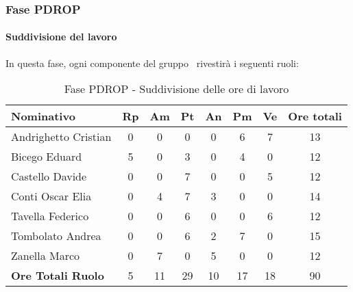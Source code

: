 \documentclass[../PianoProgetto.tex]{subfiles}
\begin{document}
	\subsubsection{Fase PDROP}
				\paragraph{Suddivisione del lavoro}
					In questa fase, ogni componente del gruppo \leaf\ rivestirà i seguenti ruoli:
	
	\begin{table}[h]
		\begin{tabularx}{\textwidth}{l  * {6}{C}  c}
			\toprule
			\textbf{Nominativo} & \textbf{Rp} & \textbf{Am} & \textbf{Pt} 
						& \textbf{An} & \textbf{Pm} & \textbf{Ve} & \textbf{Ore totali} \\
			\midrule
			Andrighetto Cristian & 0 & 0 & 0 & 0 & 6 & 7 & 13 \\
			Bicego Eduard & 5 & 0 &	3 &	0 &	4 &	0 &	12 \\
			Castello Davide & 0 & 0 & 7 & 0 & 0 & 5 & 12 \\
			Conti Oscar Elia &0 & 4 & 7 & 3 & 0 & 0 & 14 \\
			Tavella Federico &	0 & 0 & 6 & 0 & 0 & 6 & 12 \\
			Tombolato Andrea & 0 & 0 & 6 & 2 & 7 & 0 & 15 \\
			Zanella Marco & 0 & 7 & 0 & 5 & 0 & 0 & 12 \\
			\midrule			
			\textbf{Ore Totali Ruolo} & 5 & 11 & 29 & 10 & 17 & 18 & 90 \\
			\bottomrule
		\end{tabularx}
		
		\caption{Fase PDROP - Suddivisione delle ore di lavoro}
		\label{tab:fasePDROP_ore}
		
	\end{table}
	
\end{document}
